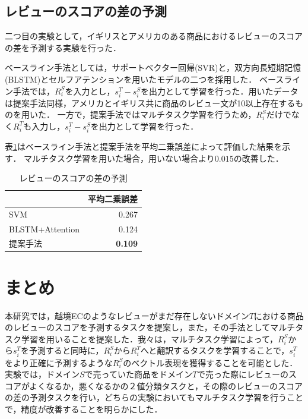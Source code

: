 \documentclass[dvipdfmx,twocolumn,10.5pt]{jsarticle}
\begin{document}
\subsection{レビューのスコアの差の予測}\label{ex_create}
二つ目の実験として，イギリスとアメリカのある商品におけるレビューのスコアの差を予測する実験を行った．

ベースライン手法としては，サポートベクター回帰(SVR)と，双方向長短期記憶(BLSTM)とセルフアテンションを用いたモデルの二つを採用した．
ベースライン手法では，$R^S_i$を入力とし，$s^T_i - s^S_i$を出力として学習を行った．用いたデータは提案手法同様，アメリカとイギリス共に商品のレビュー文が10以上存在するものを用いた．
一方で，提案手法ではマルチタスク学習を行うため，$R^S_i$だけでなく$R^T_i$も入力し，$s^T_i - s^S_i$を出力として学習を行った．

表\ref{score_diff_result}はベースライン手法と提案手法を平均二乗誤差によって評価した結果を示す．
マルチタスク学習を用いた場合，用いない場合より$0.015$の改善した．

\begin{table}[tb]
\centering
\caption{レビューのスコアの差の予測}
\begin{tabular}{lr}
\hline
\multicolumn{1}{c}{} & \multicolumn{1}{c}{平均二乗誤差} \\ \hline
SVM         & 0.267 \\
BLSTM+Attention         & 0.124       \\ 
提案手法         &  \bf{0.109}    \\ \hline
\end{tabular}
\label{score_diff_result}
\end{table}

\section{まとめ}\label{matome}

本研究では，越境ECのようなレビューがまだ存在しないドメイン$T$における商品のレビューのスコアを予測するタスクを提案し，また，その手法としてマルチタスク学習を用いることを提案した．我々は，マルチタスク学習によって，$R_i^S$から$s_i^T$を予測すると同時に，$R_i^S$から$R_i^T$へと翻訳するタスクを学習することで，$s_i^T$をより正確に予測するような$R_i^S$のベクトル表現を獲得することを可能とした．実験では，ドメイン$S$で売っていた商品をドメイン$T$で売った際にレビューのスコアがよくなるか，悪くなるかの２値分類タスクと，その際のレビューのスコアの差の予測タスクを行い，どちらの実験においてもマルチタスク学習を行うことで，精度が改善することを明らかにした．
\end{document}
